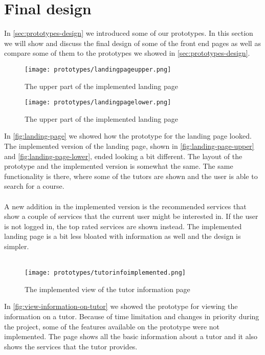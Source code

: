 \section{Final design}
In \autoref{sec:prototypes-design} we introduced some of our prototypes.
In this section we will show and discuss the final design of some of the front end pages as well as compare some of them to the prototypes we showed in \autoref{sec:prototypes-design}.
\begin{figure}
    \centering
    \texttt{[image: prototypes/landingpageupper.png]} 
    \caption{The upper part of the implemented landing page}
    \label{fig:landing-page-upper}
\end{figure}
\begin{figure}
    \centering
    \texttt{[image: prototypes/landingpagelower.png]} 
    \caption{The upper part of the implemented landing page}
    \label{fig:landing-page-lower}
\end{figure}
\noindent
In \autoref{fig:landing-page} we showed how the prototype for the landing page looked.
The implemented version of the landing page, shown in \autoref{fig:landing-page-upper} and \autoref{fig:landing-page-lower}, ended looking a bit different.
The layout of the prototype and the implemented version is somewhat the same. 
The same functionality is there, where some of the tutors are shown and the user is able to search for a course. 
\\\\
A new addition in the implemented version is the recommended services that show a couple of services that the current user might be interested in. 
If the user is not logged in, the top rated services are shown instead. 
The implemented landing page is a bit less bloated with information as well and the design is simpler.
\\\\
\begin{figure}
    \centering
    \texttt{[image: prototypes/tutorinfoimplemented.png]} 
    \caption{The implemented view of the tutor information page}
    \label{fig:tutor-info-implemented}
\end{figure}
\noindent
In \autoref{fig:view-information-on-tutor} we showed the prototype for viewing the information on a tutor.
Because of time limitation and changes in priority during the project, some of the features available on the prototype were not implemented. The page shows all the basic information about a tutor and it also shows the services that the tutor provides.
